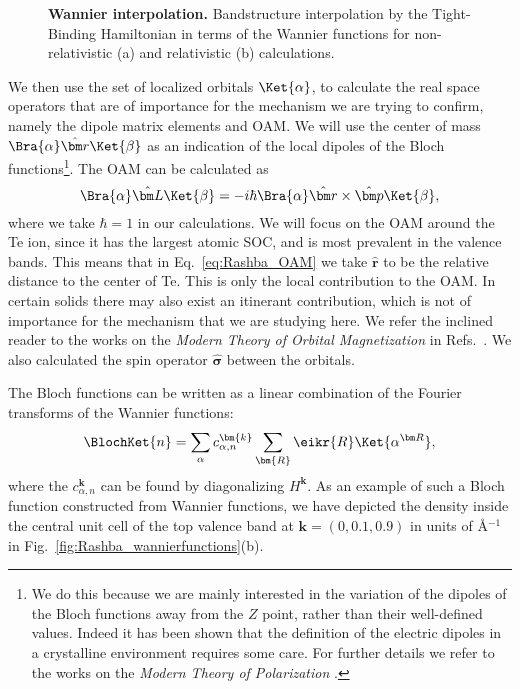 \begin{figure}[h]
\caption{\label{fig:Rashba_wannierization}{\bf Wannier interpolation.} Bandstructure interpolation by the Tight-Binding Hamiltonian in terms of the Wannier functions for non-relativistic (a) and relativistic (b) calculations.}
\end{figure}
We then use the set of localized orbitals $\Ket{\alpha}$, to calculate the real space operators that are of importance for the mechanism we are trying to confirm, namely the dipole matrix elements and OAM.
We will use the center of mass $\Bra{\alpha} \hat{\bm r} \Ket{\beta}$ as an indication of the local dipoles of the Bloch functions\footnote{We do this because we are mainly interested in the variation of the dipoles of the Bloch functions away from the $Z$ point, rather than their well-defined values. Indeed it has been shown that the definition of the electric dipoles in a crystalline environment requires some care. For further details we refer to the works on the {\it Modern Theory of Polarization} \cite{King-Smith1993,Vanderbilt1993,Resta1998, Spaldin2012,Vanderbilt18}.}.
The OAM can be calculated as
\begin{equation}
	\label{eq:Rashba_OAM}
	\Bra{\alpha}\hat{\bm L}\Ket{\beta} = -i\hbar \Bra{\alpha} \hat{\bm r} \times \hat{\bm p} \Ket{\beta},
\end{equation}
where we take $\hbar = 1$ in our calculations.
We will focus on the OAM around the Te ion, since it has the largest atomic SOC, and is most prevalent in the valence bands. This means that in Eq.~\eqref{eq:Rashba_OAM} we take $\hat{\bm r}$ to be the relative distance to the center of Te.
This is only the local contribution to the OAM. In certain solids there may also exist an itinerant contribution, which is not of importance for the mechanism that we are studying here. We refer the inclined reader to the works on the {\it Modern Theory of Orbital Magnetization} in Refs.~\cite{Thonhauser2005OrbitalInsulators,Ceresoli2006OrbitalMetals,Thonhauser2011,Vanderbilt18}.
We also calculated the spin operator $\hat{\bm \sigma}$ between the orbitals.

The Bloch functions can be written as a linear combination of the Fourier transforms of the Wannier functions:
\begin{equation}
	\label{eq:Rashba_blochfromwan}
	\BlochKet{n} = \sum_{\alpha} c_{\alpha, n}^{\bm{k}}\sum_{\bm{R}} \eikr{R}\Ket{\alpha^{\bm R}},
\end{equation}
where the $c_{\alpha,n}^{\bm{k}}$ can be found by diagonalizing $H^{\bm k}$. As an example of such a Bloch function constructed from Wannier functions, we have depicted the density inside the central unit cell of the top valence band at $\bm k = (0, 0.1, 0.9)$ in units of \AA$^{-1}$ in Fig.~\ref{fig:Rashba_wannierfunctions}(b).

